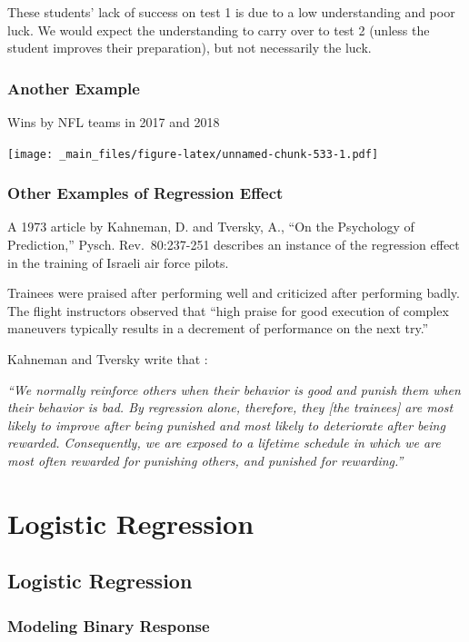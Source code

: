 \documentclass[]{book}
\begin{document}
These students' lack of success on test 1 is due to a low understanding
and poor luck. We would expect the understanding to carry over to test 2
(unless the student improves their preparation), but not necessarily the
luck.

\subsection{Another Example}\label{another-example}

Wins by NFL teams in 2017 and 2018

\texttt{[image: \_main\_files/figure-latex/unnamed-chunk-533-1.pdf]}

\subsection{Other Examples of Regression
Effect}\label{other-examples-of-regression-effect}

A 1973 article by Kahneman, D. and Tversky, A., ``On the Psychology of
Prediction,'' Pysch. Rev.~80:237-251 describes an instance of the
regression effect in the training of Israeli air force pilots.

Trainees were praised after performing well and criticized after
performing badly. The flight instructors observed that ``high praise for
good execution of complex maneuvers typically results in a decrement of
performance on the next try.''

Kahneman and Tversky write that :

\emph{``We normally reinforce others when their behavior is good and
punish them when their behavior is bad. By regression alone, therefore,
they {[}the trainees{]} are most likely to improve after being punished
and most likely to deteriorate after being rewarded. Consequently, we
are exposed to a lifetime schedule in which we are most often rewarded
for punishing others, and punished for rewarding.''}

\chapter{Logistic Regression}\label{logistic-regression}

\section{Logistic Regression}\label{logistic-regression-1}

\subsection{Modeling Binary Response}\label{modeling-binary-response}
\end{document}

